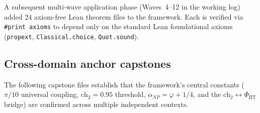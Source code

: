 \documentclass[11pt,a4paper]{article}
\theoremstyle{definition}
\begin{document}
A subsequent multi-wave application phase (Waves~4--12 in the working
log) added $24$ axiom-free Lean theorem files to the framework. Each
is verified via \texttt{\#print axioms} to depend only on the standard
Lean foundational axioms (\texttt{propext}, \texttt{Classical.choice},
\texttt{Quot.sound}).

\subsection{Cross-domain anchor capstones}

The following capstone files establish that the framework's central
constants ($\pi/10$ universal coupling, $\mathrm{ch}_2 = 0.95$
threshold, $\alpha_{NP} = \varphi + 1/4$, and the
$\mathrm{ch}_2 \leftrightarrow \Phi_{\mathrm{IIT}}$ bridge) are
confirmed across multiple independent contexts.
\end{document}
